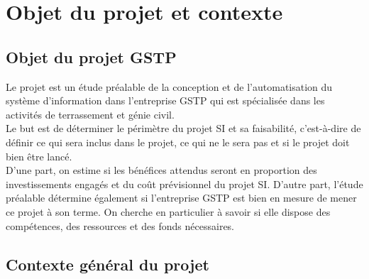 \section{Objet du projet et contexte}

\subsection{Objet du projet GSTP}
Le projet est un étude préalable de la conception et de l'automatisation du système d'information dans l'entreprise GSTP qui est spécialisée dans les activités de terrassement et génie civil.\\

Le but est de déterminer le périmètre du projet SI et sa faisabilité, c’est-à-dire de définir ce qui sera inclus dans le projet, ce qui ne le sera pas et si le projet doit bien être lancé.\\

D’une part, on estime si les bénéfices attendus seront en proportion des investissements engagés et du coût prévisionnel du projet SI.
D’autre part, l’étude préalable détermine également si l’entreprise GSTP est bien en mesure de mener ce projet à son terme. On cherche en particulier à savoir si elle dispose des compétences, des ressources et des fonds nécessaires.\\


\subsection{Contexte général du projet}

